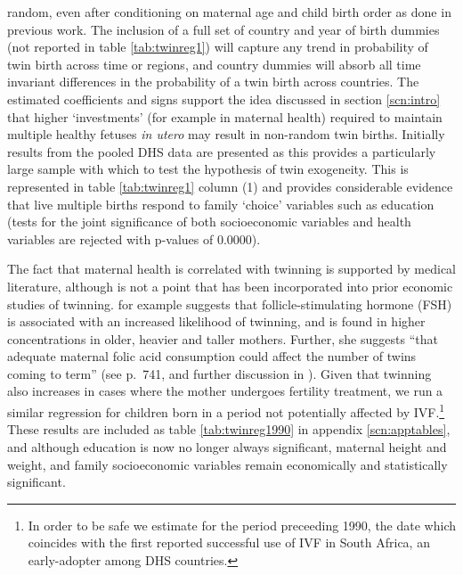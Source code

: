 \documentclass{article}[11pt,subeqn]
\begin{document}
\begin{spacing}{1.5}
\noindent random, even after conditioning on maternal age and child birth order as done in previous work. The inclusion of a full set of country and 
year of birth dummies (not reported in table \ref{tab:twinreg1}) will capture any trend in probability of twin birth across time or regions, and country 
dummies will absorb all time invariant differences in the probability of a twin birth across countries.  The estimated coefficients and signs support the 
idea discussed in section \ref{scn:intro} that higher `investments' (for example in maternal health) required to maintain multiple healthy fetuses \emph{in 
utero} may result in non-random twin births. Initially results from the pooled DHS data are presented as this provides a particularly large sample with which 
to test the hypothesis of twin exogeneity.  This is represented in table \ref{tab:twinreg1} column (1) and provides considerable evidence that live multiple
births respond to family `choice' variables such as education (tests for the joint significance of both socioeconomic variables and health variables are 
rejected with p-values of 0.0000).

The fact that maternal health is correlated with twinning is supported by medical literature, although is not a point that has been incorporated into prior 
economic studies of twinning.  \citet{Hall2003} for example suggests that follicle-stimulating hormone (FSH) is associated with an increased likelihood of 
twinning, and is found in higher concentrations in older, heavier and taller mothers.  Further, she suggests ``that adequate maternal folic acid consumption 
could affect the number of twins coming to term'' (see p.\ 741, and further discussion in \citet{Lietal2003}).  Given that twinning also increases in cases where 
the mother undergoes fertility treatment, we run a similar regression for children born in a period not potentially affected by IVF.\footnote{In order to be
safe we estimate for the period preceeding 1990, the date which coincides with the first reported successful use of IVF in South Africa, an early-adopter among
DHS countries.}  These results are
included as table \ref{tab:twinreg1990} in appendix \ref{scn:apptables}, and although education is now no longer always significant, maternal height and weight, 
and family socioeconomic variables remain economically and statistically significant.


\end{spacing}
\end{document}
